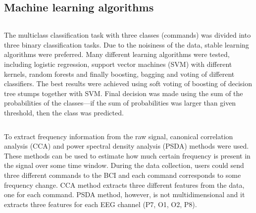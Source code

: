 \documentclass[final]{beamer}
\begin{document}
\begin{poster}
\vspace{0.5cm}

\section{Machine learning algorithms}

\begin{columns}[T]
\vspace{1.7cm}
\justify
The multiclass classification task with three classes (commands) was divided into three binary classification tasks. Due to the noisiness of the data, stable learning algorithms were preferred. Many different learning algorithms were tested, including logistic regression, support vector machines (SVM) with different kernels, random forests and finally boosting, bagging and voting of different classifiers. The best results were achieved using soft voting of boosting of decision tree stumps together with SVM. Final decision was made using the sum of the probabilities of the classes---if the sum of probabilities was larger than given threshold, then the class was predicted. 

\end{columns}

\newcolumn

\vspace{0.1cm}
\justify
To extract frequency information from the raw signal, canonical correlation analysis (CCA) and power spectral density analysis (PSDA) methods were used. These methods can be used to estimate how much certain frequency is present in the signal over some time window. During the data collection, users could send three different commands to the BCI and each command corresponds to some frequency change. CCA method extracts three different features from the data, one for each command. PSDA method, however, is not multidimensional and it extracts three features for each EEG channel (P7, O1, O2, P8).

\vspace{43.5cm}

\end{poster}
\end{document}
